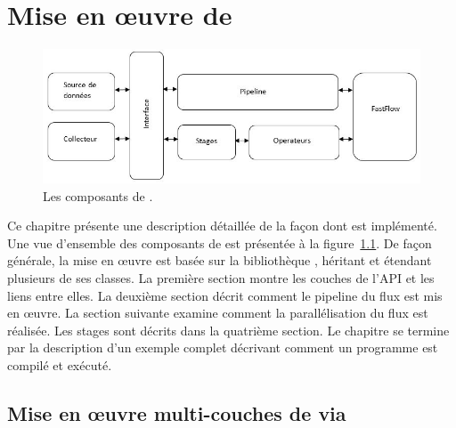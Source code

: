 
\chapter{Mise en \oe{}uvre de \PpFf}
\label{implementation.chap}






\begin{figure}
\centering
     \includegraphics[width=1.0\textwidth]{Figures/AllComponentsAPI.jpg}
      \caption{Les composants de .}
       \label{AllComponentsAPI.fig}
\end{figure}


Ce chapitre pr\'esente une description d\'etaill\'ee de la fa\c{c}on dont  est impl\'ement\'e. Une vue d'ensemble des composants de  est pr\'esent\'ee \`a la figure~\ref{AllComponentsAPI.fig}. De fa\c{c}on g\'en\'erale, la mise en \oe{}uvre est bas\'ee sur la biblioth\`eque , h\'eritant et \'etendant plusieurs de ses classes. La premi\`ere section montre les couches de l'API et les liens entre elles.  La deuxi\`eme section d\'ecrit comment le pipeline du flux est mis en œuvre. La section suivante examine comment la parall\'elisation du flux est r\'ealis\'ee. Les stages sont d\'ecrits dans la quatri\`eme section. Le chapitre se termine par la description d'un exemple complet d\'ecrivant comment un programme \PpFf{} est compil\'e et ex\'ecut\'e.


\section{Mise en \oe{}uvre multi-couches de \PpFf{} via }

